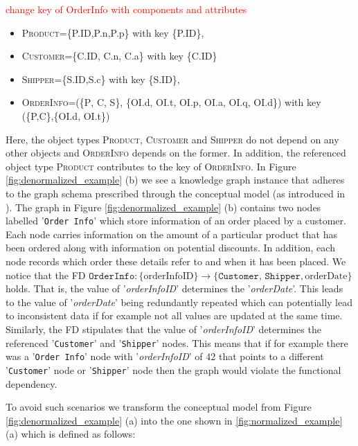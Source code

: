 \documentclass[sigconf]{acmart}
\begin{document}
\textcolor{red}{change key of OrderInfo with components and attributes}


\begin{itemize}\small
\item[] \textsc{Product}=\{P.ID,P.n,P.p\} with key \{P.ID\},
\item[] \textsc{Customer}=\{C.ID, C.n, C.a\} with key \{C.ID\} 
\item[] \textsc{Shipper}=\{S.ID,S.c\} with key \{S.ID\},
\item[] \textsc{OrderInfo}=(\{\textsc{P}, \textsc{C}, \textsc{S}\}, \{OI.d, OI.t, OI.p, OI.a, OI.q, OI.d\}) with key (\{\textsc{P,C}\},\{OI.d, OI.t\})
\end{itemize}

\noindent Here, the object types \textsc{Product}, \textsc{Customer} and \textsc{Shipper} do not depend on any other objects and \textsc{OrderInfo} depends on the former. In addition, the referenced object type \textsc{Product} contributes to the key of \textsc{OrderInfo}. In Figure \ref{fig:denormalized_example} (b) we see a knowledge graph instance that adheres to the graph schema prescribed through the conceptual model (as introduced in \cite{Skavantzos_25_ER_Graphs}). The graph in Figure \ref{fig:denormalized_example} (b) contains two nodes labelled '\texttt{Order Info}' which store information of an order placed by a customer. Each node carries information on the amount of a particular product that has been ordered along with information on potential discounts. In addition, each node records which order these details refer to and when it has been placed. We notice that the FD $\texttt{OrderInfo} : \{\text{orderInfoID}\} \rightarrow \{\texttt{Customer, Shipper}, \text{orderDate}\}$ holds. That is, the value of '\emph{orderInfoID}' determines the '\emph{orderDate}'. This leads to the value of '\emph{orderDate}' being redundantly repeated which can potentially lead to inconsistent data if for example not all values are updated at the same time. Similarly, the FD stipulates that the value of '\emph{orderInfoID}' determines the referenced '\texttt{Customer}' and '\texttt{Shipper}' nodes. This means that if for example there was a  '\texttt{Order Info}' node with '\emph{orderInfoID}' of 42 that points to a different '\texttt{Customer}' node or '\texttt{Shipper}' node then the graph would violate the functional dependency.

To avoid such scenarios we transform the conceptual model from Figure \ref{fig:denormalized_example} (a) into the one shown in \ref{fig:normalized_example} (a)  which is defined as follows:
\end{document}
